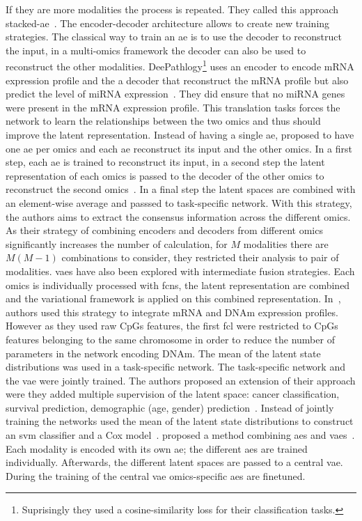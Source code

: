 \documentclass[../main.tex]{subfiles}
\begin{document}
	    If they are more modalities the process is repeated.
	    They called this approach stacked-\gls{ae}~\cite{Wu2022StackedAB}.
	    The encoder-decoder architecture allows to create new training strategies.
	    The classical way to train an \gls{ae} is to use the decoder to reconstruct the input, in a multi-omics framework the decoder can also be used to reconstruct the other modalities.
	    DeePathlogy\footnote{Suprisingly they used a cosine-similarity loss for their classification tasks.} uses an encoder to encode mRNA expression profile and the a decoder that reconstruct the mRNA profile but also predict the level of miRNA expression~\cite{Azarkhalili2019}.
	    They did ensure that no miRNA genes were present in the mRNA expression profile.
	    This translation tasks forces the network to learn the relationships between the two omics and thus should improve the latent representation.
	    Instead of having a single \gls{ae}, \citeauthor{CrossAE} proposed to have one \gls{ae} per omics and each \gls{ae} reconstruct its input and the other omics.
	    In a first step, each \gls{ae} is trained to reconstruct its input, in a second step the latent representation of each omics is passed to the decoder of the other omics to reconstruct the second omics~\cite{CrossAE}.
	    In a final step the latent spaces are combined with an element-wise average and passsed to task-specific network.
	    With this strategy, the authors aims to extract the consensus information across the different omics.
	    As their strategy of combining encoders and decoders from different omics significantly increases the number of calculation, for \(M\) modalities there are \(M(M-1)\) combinations to consider, they restricted their analysis to pair of modalities.
	    \Glspl{vae} have also been explored with intermediate fusion strategies.
	    Each omics is individually processed with \glspl{fcn}, the latent representation are combined and the variational framework is applied on this combined representation.
	    In~\cite{Zhang2019}, authors used this strategy to integrate mRNA and DNAm expression profiles.
	    However as they used raw CpGs features, the first \gls{fcl} were restricted to CpGs features belonging to the same chromosome in order to reduce the number of parameters in the network encoding DNAm.
	    The mean of the latent state distributions was used in a task-specific network.
	    The task-specific network and the \gls{vae} were jointly trained.
	    The authors proposed an extension of their approach were they added multiple supervision of the latent space: cancer classification, survival prediction, demographic (age, gender) prediction~\cite{Zhang2021}.
	    Instead of jointly training the networks \citeauthor{Hira2021} used the mean of the latent state distributions to construct an \gls{svm} classifier and a Cox model~\cite{Hira2021}.
	    \citeauthor{customics} proposed a method combining \glspl{ae} and \glspl{vae}~\cite{customics}.
	    Each modality is encoded with its own \gls{ae}; the different \glspl{ae} are trained individually.
	    Afterwards, the different latent spaces are passed to a central \gls{vae}.
	    During the training of the central \gls{vae} omics-specific \glspl{ae} are finetuned.
\end{document}
